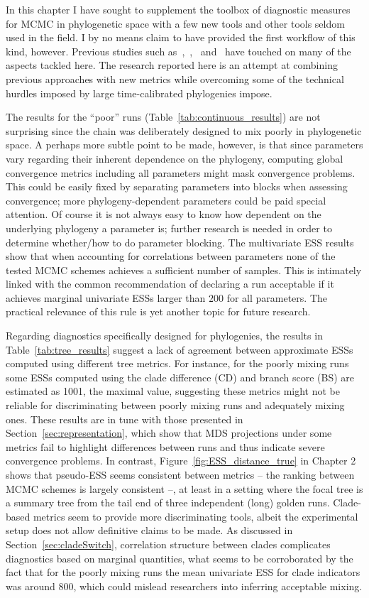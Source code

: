 In this chapter I have sought to supplement the toolbox of diagnostic measures for MCMC in phylogenetic space with a few new tools and other tools seldom used in the field.
I by no means claim to have provided the first workflow of this kind, however.
Previous studies such as~\cite{Hillis2005},~\cite{Lakner2008},~\cite{Nylander2008} and~\cite{Warren2017} have touched on many of the aspects tackled here.
The research reported here is an attempt at combining previous approaches with new metrics while overcoming some of the technical hurdles imposed by large time-calibrated phylogenies impose.

The results for the ``poor'' runs (Table~\ref{tab:continuous_results}) are not surprising since the chain was deliberately designed to mix poorly in phylogenetic space.
A perhaps more subtle point to be made, however, is that since parameters vary regarding their inherent dependence on the phylogeny, computing global convergence metrics including all parameters might mask convergence problems.
This could be easily fixed by separating parameters into blocks when assessing convergence; more phylogeny-dependent parameters could be paid special attention.
Of course it is not always easy to know how dependent on the underlying phylogeny a parameter is; further research is needed in order to determine whether/how to do parameter blocking.
The multivariate ESS results show that when accounting for correlations between parameters none of the tested MCMC schemes achieves a sufficient number of samples.
This is intimately linked with the common recommendation of declaring a run acceptable if it achieves marginal univariate ESSs larger than $200$ for all parameters.
The practical relevance of this rule is yet another topic for future research.

Regarding diagnostics specifically designed for phylogenies, the results in Table~\ref{tab:tree_results} suggest a lack of agreement between approximate ESSs computed using different tree metrics.
For instance, for the poorly mixing runs some ESSs computed using the clade difference (CD) and branch score (BS) are estimated as 1001, the maximal value, suggesting these metrics might not be reliable for discriminating between poorly mixing runs and adequately mixing ones.
These results are in tune with those presented in Section~\ref{sec:representation}, which show that MDS projections under some metrics fail to highlight differences between runs and thus indicate severe convergence problems. 
In contrast, Figure~\ref{fig:ESS_distance_true} in Chapter 2 shows that pseudo-ESS seems consistent between metrics -- the ranking between MCMC schemes is largely consistent --, at least in a setting where the focal tree is a summary tree from the tail end of three independent (long) golden runs.
Clade-based metrics seem to provide more discriminating tools, albeit the experimental setup does not allow definitive claims to be made.
As discussed in Section~\ref{sec:cladeSwitch}, correlation structure between clades complicates diagnostics based on marginal quantities, what seems to be corroborated by the fact that for the poorly mixing runs the mean univariate ESS for clade indicators was around $800$, which could mislead researchers into inferring acceptable mixing.

